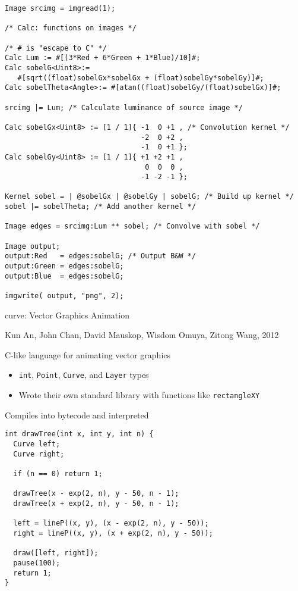 \documentclass{plt}
\begin{document}
\begin{frame}[fragile]

\fontsize{8pt}{8pt}\selectfont
\begin{verbatim}
Image srcimg = imgread(1);

/* Calc: functions on images */

/* # is "escape to C" */
Calc Lum := #[(3*Red + 6*Green + 1*Blue)/10]#;
Calc sobelG<Uint8>:=
   #[sqrt((float)sobelGx*sobelGx + (float)sobelGy*sobelGy)]#;
Calc sobelTheta<Angle>:= #[atan((float)sobelGy/(float)sobelGx)]#;

srcimg |= Lum; /* Calculate luminance of source image */

Calc sobelGx<Uint8> := [1 / 1]{ -1  0 +1 , /* Convolution kernel */
                                -2  0 +2 ,
                                -1  0 +1 };
Calc sobelGy<Uint8> := [1 / 1]{ +1 +2 +1 ,
                                 0  0  0 ,
                                -1 -2 -1 };

Kernel sobel = | @sobelGx | @sobelGy | sobelG; /* Build up kernel */
sobel |= sobelTheta; /* Add another kernel */

Image edges = srcimg:Lum ** sobel; /* Convolve with sobel */

Image output;
output:Red   = edges:sobelG; /* Output B&W */
output:Green = edges:sobelG;
output:Blue  = edges:sobelG;

imgwrite( output, "png", 2);
\end{verbatim}

\end{frame}

\begin{frame}{curve: Vector Graphics Animation}

{\small Kun An,
John Chan,
David Mauskop,
Wisdom Omuya,
Zitong Wang, 2012}

C-like language for animating vector graphics

\begin{itemize}
\item \texttt{int}, \texttt{Point}, \texttt{Curve}, and \texttt{Layer} types
\item Wrote their own standard library with functions like \texttt{rectangleXY}
\end{itemize}

Compiles into bytecode and interpreted

\end{frame}

\begin{frame}[fragile]
\fontsize{9pt}{10pt}\selectfont
\begin{verbatim}
int drawTree(int x, int y, int n) {
  Curve left;
  Curve right;

  if (n == 0) return 1;

  drawTree(x - exp(2, n), y - 50, n - 1);
  drawTree(x + exp(2, n), y - 50, n - 1);

  left = lineP((x, y), (x - exp(2, n), y - 50));
  right = lineP((x, y), (x + exp(2, n), y - 50));
  
  draw([left, right]);
  pause(100);
  return 1;
}
\end{verbatim}
\end{frame}
\end{document}
